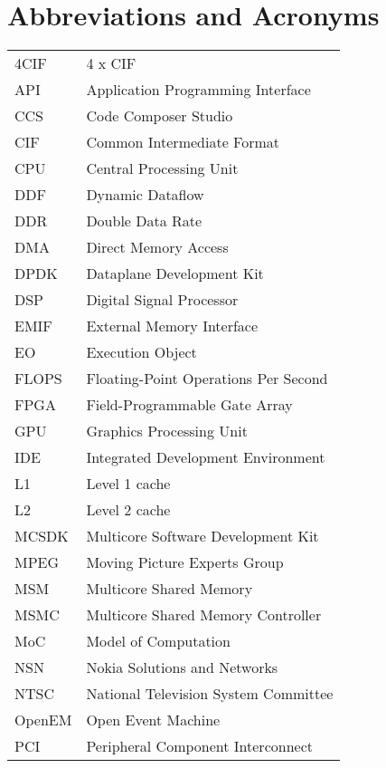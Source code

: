 \chapter*{Abbreviations and Acronyms}


\noindent
\begin{longtable}{@{}p{}p{}@{}}
    4CIF & 4 x CIF \\
    API & Application Programming Interface \\
    CCS & Code Composer Studio \\
    CIF & Common Intermediate Format \\
    CPU & Central Processing Unit \\
    DDF & Dynamic Dataflow \\
    DDR & Double Data Rate \\
    DMA & Direct Memory Access \\
    DPDK & Dataplane Development Kit \\
    DSP & Digital Signal Processor \\
    EMIF & External Memory Interface \\
    EO & Execution Object \\
    FLOPS & Floating-Point Operations Per Second \\
    FPGA & Field-Programmable Gate Array \\
    GPU & Graphics Processing Unit \\
    IDE & Integrated Development Environment \\
    L1 & Level 1 cache \\
    L2 & Level 2 cache \\
    MCSDK & Multicore Software Development Kit \\
    MPEG & Moving Picture Experts Group \\
    MSM & Multicore Shared Memory \\
    MSMC & Multicore Shared Memory Controller \\
    MoC & Model of Computation \\
    NSN & Nokia Solutions and Networks \\
    NTSC & National Television System Committee \\
    OpenEM & Open Event Machine \\
    PCI & Peripheral Component Interconnect \\

\end{longtable}
